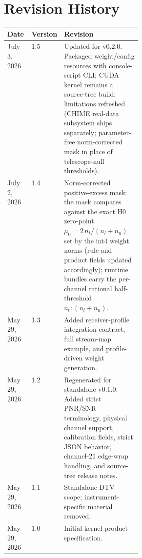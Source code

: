 \documentclass[10pt,letterpaper]{article}
\newcommand{\code}[1]{\texttt{\detokenize{#1}}}
\begin{document}
\section{Revision History}
\begin{tabularx}{\linewidth}{|L{0.18\linewidth}|L{0.14\linewidth}|Y|}
\hline
\textbf{Date} & \textbf{Version} & \textbf{Revision}\\ \hline
July 3, 2026 & 1.5 & Updated for \code{pilot-proxy} v0.2.0.  Packaged weight/config resources with console-script CLI; CUDA kernel remains a source-tree build; limitations refreshed (CHIME real-data subsystem ships separately; parameter-free norm-corrected mask in place of telescope-null thresholds).\\ \hline
July 2, 2026 & 1.4 & Norm-corrected positive-excess mask: the mask compares against the exact H0 zero-point $\mu_0 = 2\,n_t/(n_l+n_u)$ set by the int4 weight norms (rule and product fields updated accordingly); runtime bundles carry the per-channel rational half-threshold $n_t:(n_l+n_u)$.\\ \hline
May 29, 2026 & 1.3 & Added receiver-profile integration contract, full stream-map example, and profile-driven weight generation.\\ \hline
May 29, 2026 & 1.2 & Regenerated for standalone \code{pilot-proxy} v0.1.0.  Added strict PNR/SNR terminology, physical channel support, calibration fields, strict JSON behavior, channel-21 edge-wrap handling, and source-tree release notes.\\ \hline
May 29, 2026 & 1.1 & Standalone DTV scope; instrument-specific material removed.\\ \hline
May 29, 2026 & 1.0 & Initial kernel product specification.\\ \hline
\end{tabularx}
\end{document}
